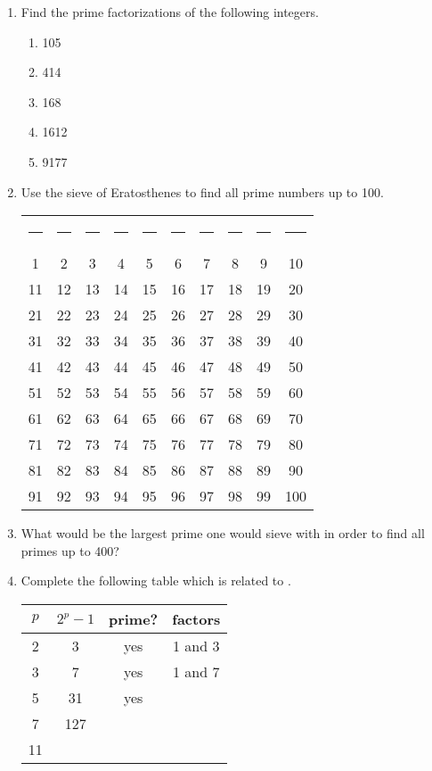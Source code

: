 \begin{enumerate}

\item Find the prime factorizations of the following integers.

  \begin{enumerate}
  \item 105
  \item 414
  \item 168
  \item 1612
  \item 9177
  \end{enumerate}

\item Use the sieve of Eratosthenes to find all prime numbers
up to 100.

\begin{tabular}{cccccccccc}
\rule{14pt}{0pt} & \rule{14pt}{0pt} & \rule{14pt}{0pt} &
\rule{14pt}{0pt} & \rule{14pt}{0pt} & \rule{14pt}{0pt} & 
\rule{14pt}{0pt} & \rule{14pt}{0pt} & \rule{14pt}{0pt} &
\rule{14pt}{0pt} \\
 1 & 2 & 3 & 4 & 5 & 6 & 7 & 8 & 9 & 10 \\
 11 & 12 & 13 & 14 & 15 & 16 & 17 & 18 & 19 & 20 \\
 21 & 22 & 23 & 24 & 25 & 26 & 27 & 28 & 29 & 30 \\
 31 & 32 & 33 & 34 & 35 & 36 & 37 & 38 & 39 & 40 \\
 41 & 42 & 43 & 44 & 45 & 46 & 47 & 48 & 49 & 50 \\
 51 & 52 & 53 & 54 & 55 & 56 & 57 & 58 & 59 & 60 \\ 
 61 & 62 & 63 & 64 & 65 & 66 & 67 & 68 & 69 & 70 \\
 71 & 72 & 73 & 74 & 75 & 76 & 77 & 78 & 79 & 80 \\
 81 & 82 & 83 & 84 & 85 & 86 & 87 & 88 & 89 & 90 \\
 91 & 92 & 93 & 94 & 95 & 96 & 97 & 98 & 99 & 100
\end{tabular}

\item What would be the largest prime one would sieve with
in order to find all primes up to 400?

\newpage

\item Complete the following table which is related to 
.

\begin{tabular}{c|c|c|c}
$p$ & $2^p-1$ & prime? & factors \\ \hline
2 & 3 & yes & 1 and 3 \\
3 & 7 & yes & 1 and 7 \\
5 & 31 & yes &  \\
7 & 127   &     &    \\
11 &   &     &    
\end{tabular}


\end{enumerate}
